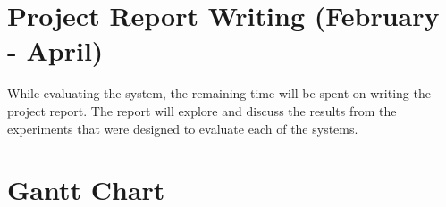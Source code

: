 \section{Project Report Writing (February - April)}
While evaluating the system, the remaining time will be spent on writing the project report. The report will explore and discuss the results from the experiments that were designed to evaluate each of the systems.

\section{Gantt Chart}
\begin{gantt}[xunitlength=1.2cm,drawledgerline=true]{7}{8}
	\begin{ganttitle}
	\end{ganttitle}
\end{gantt}
